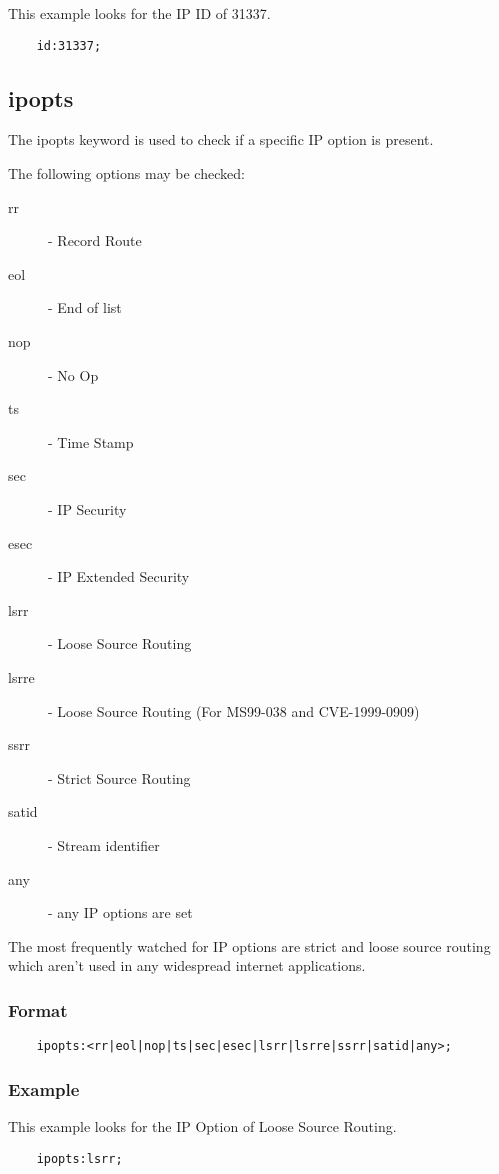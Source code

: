 \documentclass[english]{report}
\begin{document}
This example looks for the IP ID of 31337.

\begin{verbatim}
    id:31337;
\end{verbatim}

\subsection{ipopts}

The ipopts keyword is used to check if a specific IP option is present.

The following options may be checked:

\begin{description}
\item [rr] - Record Route 
\item [eol] - End of list 
\item [nop] - No Op 
\item [ts] - Time Stamp 
\item [sec] - IP Security
\item [esec] - IP Extended Security
\item [lsrr] - Loose Source Routing
\item [lsrre] - Loose Source Routing (For MS99-038 and CVE-1999-0909) 
\item [ssrr] - Strict Source Routing 
\item [satid] - Stream identifier
\item [any] - any IP options are set
\end{description}

The most frequently watched for IP options are strict and loose source routing
which aren't used in any widespread internet applications.

\subsubsection{Format}

\begin{verbatim}
    ipopts:<rr|eol|nop|ts|sec|esec|lsrr|lsrre|ssrr|satid|any>;
\end{verbatim}

\subsubsection{Example}

This example looks for the IP Option of Loose Source Routing.

\begin{verbatim}
    ipopts:lsrr;
\end{verbatim}
\end{document}
